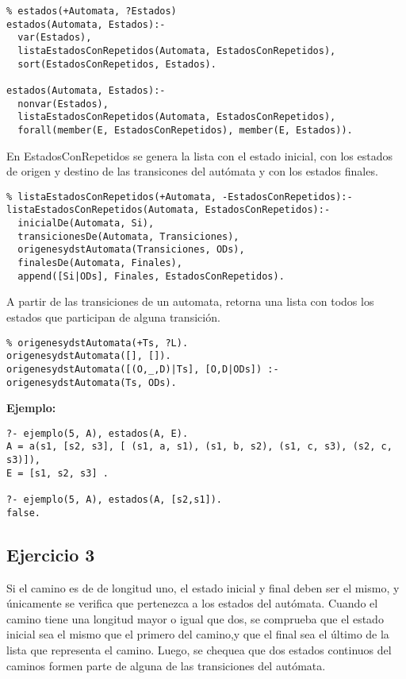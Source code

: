 \documentclass[10pt, a4paper,english,spanish,hidelinks]{article}
\begin{document}
\begin{verbatim}
% estados(+Automata, ?Estados)
estados(Automata, Estados):-
  var(Estados),
  listaEstadosConRepetidos(Automata, EstadosConRepetidos),
  sort(EstadosConRepetidos, Estados).

estados(Automata, Estados):-
  nonvar(Estados),
  listaEstadosConRepetidos(Automata, EstadosConRepetidos),
  forall(member(E, EstadosConRepetidos), member(E, Estados)). 
\end{verbatim} 

En EstadosConRepetidos se genera la lista con el estado inicial,
con los estados de origen y destino de las transicones del autómata y con
los estados finales.

\begin{verbatim}
% listaEstadosConRepetidos(+Automata, -EstadosConRepetidos):-
listaEstadosConRepetidos(Automata, EstadosConRepetidos):-
  inicialDe(Automata, Si),
  transicionesDe(Automata, Transiciones),
  origenesydstAutomata(Transiciones, ODs),
  finalesDe(Automata, Finales),
  append([Si|ODs], Finales, EstadosConRepetidos).
\end{verbatim}


A partir de las transiciones de un automata, retorna una lista con todos los estados
que participan de alguna transición.

\begin{verbatim}
% origenesydstAutomata(+Ts, ?L).
origenesydstAutomata([], []).
origenesydstAutomata([(O,_,D)|Ts], [O,D|ODs]) :- origenesydstAutomata(Ts, ODs).
\end{verbatim}

\textbf{Ejemplo:}

\begin{verbatim}
?- ejemplo(5, A), estados(A, E).
A = a(s1, [s2, s3], [ (s1, a, s1), (s1, b, s2), (s1, c, s3), (s2, c, s3)]),
E = [s1, s2, s3] .

?- ejemplo(5, A), estados(A, [s2,s1]).
false.
\end{verbatim}



\subsection{Ejercicio 3}
Si el camino es de de longitud uno, el estado inicial y final deben ser el mismo,
y únicamente se verifica que pertenezca a los estados del autómata.
Cuando el camino tiene una longitud mayor o igual que dos, se comprueba que el
estado inicial sea el mismo que el primero del camino,y que el final sea el último
de la lista que representa el camino. Luego, se chequea que dos estados continuos
del caminos formen parte de alguna de las transiciones del autómata.
\end{document}
